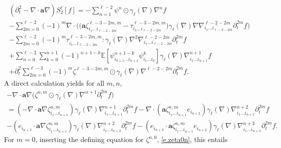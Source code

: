 \documentclass[JEP,XML,SOM,Unicode,published]{cedram}
\theoremstyle{plain}
\theoremstyle{definition}
\numberwithin{equation}{section}
\newcommand{\ee}{e}
\newcommand{\Aa}{\boldsymbol a}
\newcommand{\expec}[1]{\mathbb{E}\left[ #1 \right]}
\begin{document}
\begin{multline}\label{eq:rep-eqn-S2ell}
(\partial_t^2-\nabla\cdot\Aa\nabla) S_2^\ell[f]
=-\sum_{n=1}^{\ell-2}\psi^{n}\odot\gamma_{\ell}(\nabla)\nabla^{n} f\\[-5pt]
-\sum_{2m=0}^{\ell-2}(-1)^m\nabla\cdot\Big(\big(\Aa\zeta^{\ell-3-2m,m}_{i_1\ldots i_{\ell-2-2m}}-\tau^{\ell-3-2m,m}_{i_1\ldots i_{\ell-2-2m}}\big)\gamma_{\ell}(\nabla)\nabla\nabla^{\ell-2-2m}_{i_1\ldots i_{\ell-2-2m}}\partial_t^{2m} f\Big)\\[-5pt]
-\sum_{2m=0}^{\ell-2}(-1)^m\tau^{\ell-3-2m,m}_{i_1\ldots i_{\ell-2-2m}}:\gamma_{\ell}(\nabla)\nabla^2\nabla^{\ell-2-2m}_{i_1\ldots i_{\ell-2-2m}}\partial_t^{2m} f\\[-2pt]
+\sum_{n=0}^{\ell-2}\sum_{k=0}^{n+1}(-1)^{n+1-k}\expec{\psi^{n+1-k}_{i_{k+1}\ldots i_{n+1}}\psi^k_{i_{1}\ldots i_k}}\gamma_{\ell}(\nabla)\nabla^{n+1}_{i_1\ldots i_{n+1}} f\\[-5pt]
+\partial_t^2\sum_{2m=0}^{\ell-3}(-1)^m\zeta^{\ell-3-2m,m}\odot\gamma_{\ell}(\nabla)\nabla^{\ell-2-2m}\partial_t^{2m} f.
\end{multline}
A direct calculation yields for all $m,n$,\vspace*{-3pt}
\begin{multline*}
-\nabla\cdot\Aa\nabla\big(\zeta^{n,m} \odot \gamma_{\ell}(\nabla)\nabla^{n+1}\partial_t^{2m} f\big)\\
=(-\nabla\cdot\Aa\nabla\zeta^{n,m}_{i_1\ldots i_{n+1}}) \gamma_{\ell}(\nabla)\nabla^{n+1}_{i_1\ldots i_{n+1}}\partial_t^{2m} f
-\nabla\cdot(\Aa\zeta^{n,m}_{i_1\ldots i_{n+1}}\ee_{i_{n+2}}) \gamma_{\ell}(\nabla)\nabla^{n+2}_{i_1\ldots i_{n+2}}\partial_t^{2m} f\\
-(\ee_{i_{n+2}}\cdot\Aa\nabla\zeta^{n,m}_{i_1\ldots i_{n+1}}) \gamma_{\ell}(\nabla)\nabla^{n+2}_{i_1\ldots i_{n+2}}\partial_t^{2m} f
-(\ee_{i_{n+3}}\cdot\Aa\zeta^{n,m}_{i_1\ldots i_{n+1}}\ee_{i_{n+2}}) \gamma_{\ell}(\nabla)\nabla^{n+3}_{i_1\ldots i_{n+3}}\partial_t^{2m} f.
\end{multline*}
For $m=0$, inserting the defining equation for $\zeta^{n,0}$, \cf \eqref{e.zeta0n}, this entails\vspace*{-3pt}
\end{document}
